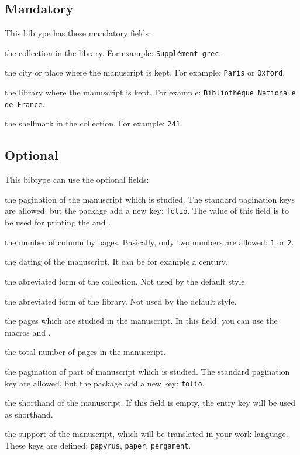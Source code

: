 \documentclass{ltxdockit}[2011/03/25]
\begin{document}
\subsection{Mandatory}
This bibtype has these mandatory fields:

\begin{fieldlist}

 the collection in the library. For example: \verb+Supplément grec+.

 the city or place where the manuscript is kept. For example: \verb+Paris+ or \verb+Oxford+.

 the library where the manuscript is kept. For example: \verb+Bibliothèque Nationale de France+.


 the shelfmark in the collection. For example: \verb+241+.
\end{fieldlist}

\subsection{Optional}
This bibtype can use the optional fields:

\begin{fieldlist}

 the pagination of the manuscript which is studied. The standard pagination keys are allowed, but the package add a new key: \texttt{folio}. The value of this field is to be used for printing the  and .

 the number of column by pages. Basically, only two numbers are allowed: \verb+1+ or \verb+2+.

 the dating of the manuscript. It can be for example a century.

 the abreviated form of the collection. Not used by the default style.


 the abreviated form of the library. Not used by the default style.


 the pages which are studied in the manuscript. In this field, you can use the macros  and .

 the total number of pages in the manuscript.


 the pagination of part of manuscript which is studied. The standard pagination key are allowed, but the package add a new key: \verb+folio+.


 the shorthand of the manuscript. If this field is empty, the entry key will be used as shorthand.

 the support of the manuscript, which will be translated in your work language. These keys are defined: \texttt{papyrus}, \texttt{paper}, \texttt{pergament}.

\end{fieldlist}
\end{document}
